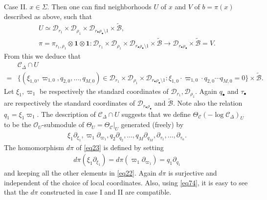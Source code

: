 \documentclass[12pt,a4paper,notitlepage]{report}
\theoremstyle{definition}
\theoremstyle{plain}
\newcommand{\mc}{\mathcal}
\newcommand{\wtd}{\widetilde}
\newcommand{\id}{\mathbf{1}}
\newcommand{\scr}{\mathscr}
\newcommand{\blt}{\bullet}
\numberwithin{equation}{section}
\begin{document}
Case II. $x\in\Sigma$. Then one can find  neighborhoods $U$ of $x$ and $V$ of $b=\pi(x)$ described as above, such that
\begin{gather*}
U\simeq \mc D_{r_1}\times \mc D_{\rho_1}\times \mc D_{r_\blt\rho_\blt\setminus 1}\times\wtd {\mc B},\\
\pi=\pi_{r_1,\rho_1}\otimes\id\otimes\id:\mc D_{r_1}\times \mc D_{\rho_1}\times \mc D_{r_\blt\rho_\blt\setminus 1}\times\wtd {\mc B}\rightarrow\mc D_{r_\blt\rho_\blt}\times\wtd{\mc B}=V.
\end{gather*}
From this we deduce that
\begin{align*}
&\mc C_\Delta\cap U\\
=&\{(\xi_{1,0},\varpi_{1,0},q_{2,0},\dots,q_{M,0})\in \mc D_{r_1}\times \mc D_{\rho_1}\times \mc D_{r_\blt\rho_\blt\setminus 1}:\xi_{1,0}\cdot\varpi_{1,0}\cdot q_{2,0}\cdots q_{M,0}=0\}\times\wtd{\mc B}.
\end{align*}
Let $\xi_1,\varpi_1$ be respectively the standard coordinates of $\mc D_{r_1},\mc D_{\rho_1}$. Again $q_\blt$ and $\tau_\blt$ are respectively the standard coordinates of $\mc D_{r_\blt\rho_\blt}$ and $\wtd {\mc B}$. Note also the relation $q_1=\xi_1\varpi_1$. The description of $\mc C_\Delta\cap U$ suggests that we define $\Theta_{\mc C}(-\log \mc C_\Delta)_U$ to be the $\scr O_U$-submodule of $\Theta_U=\Theta_{\mc C}|_U$ generated (freely) by
\begin{align}
\xi_1\partial_{\xi_1},\varpi_1\partial_{\varpi_1},q_2\partial_{q_2},\dots,q_M\partial_{q_M},\partial_{\tau_1},\dots,\partial_{\tau_n}.\label{eq22}
\end{align}
The homomorphism $d\pi$ of \eqref{eq23} is defined by setting
\begin{align}
d\pi(\xi_1\partial_{\xi_1})=d\pi(\varpi_1\partial_{\varpi_1})=q_1\partial_{q_1}\label{eq182}
\end{align}
and keeping all the other elements in \eqref{eq22}. Again $d\pi$ is surjective and independent of the choice of local coordinates. Also, using \eqref{eq74}, it is easy to see that the $d\pi$ constructed in case I and II are compatible.
\end{document}
